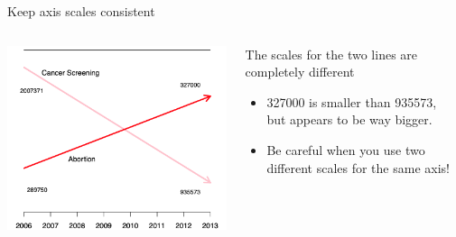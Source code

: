 \documentclass[aspectratio=169]{../latex_main/tntbeamer}  %
\begin{document}
	
	\begin{frame}{Keep axis scales consistent}
	    \begin{columns}
	        \begin{column}{.45\textwidth}
	        
	                    \centering
	                    \includegraphics[scale=.65]{Bild51}
	        \end{column}
	        
	        \begin{column}{.55\textwidth}
	        
	                The scales for the two lines are completely different
	                \begin{itemize}
	                    \item 327000 is smaller than 935573,\\ but appears to be way bigger.
	                    \item Be careful when you use two different scales for the same axis!
	                \end{itemize}
	        \end{column}
	        
	    \end{columns}
	\end{frame}
	
	
	
\end{document}

